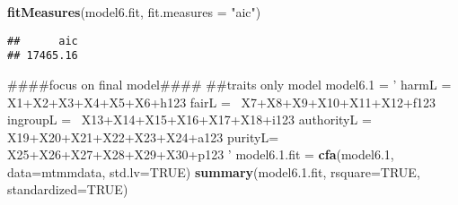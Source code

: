 \documentclass[english,man]{apa6}
\newenvironment{Shaded}{\begin{snugshade}}{\end{snugshade}}
\newcommand{\KeywordTok}[1]{\textcolor[rgb]{0.13,0.29,0.53}{\textbf{#1}}}
\newcommand{\DataTypeTok}[1]{\textcolor[rgb]{0.13,0.29,0.53}{#1}}
\newcommand{\DecValTok}[1]{\textcolor[rgb]{0.00,0.00,0.81}{#1}}
\newcommand{\FloatTok}[1]{\textcolor[rgb]{0.00,0.00,0.81}{#1}}
\newcommand{\StringTok}[1]{\textcolor[rgb]{0.31,0.60,0.02}{#1}}
\newcommand{\OtherTok}[1]{\textcolor[rgb]{0.56,0.35,0.01}{#1}}
\newcommand{\NormalTok}[1]{#1}
\newcounter{author}
\theoremstyle{definition}
\theoremstyle{definition}
\theoremstyle{definition}
\theoremstyle{remark}
\begin{document}
\begin{Shaded}
\begin{Highlighting}[]
\KeywordTok{fitMeasures}\NormalTok{(model6.fit, }\DataTypeTok{fit.measures =} \StringTok{"aic"}\NormalTok{)}
\end{Highlighting}
\end{Shaded}

\begin{verbatim}
##      aic 
## 17465.16
\end{verbatim}

\begin{Shaded}
\begin{Highlighting}[]
\NormalTok{####focus on final model####}
\NormalTok{##traits only model}
\NormalTok{model6.}\DecValTok{1}\NormalTok{ =}\StringTok{ '}
\StringTok{harmL =~ X1+X2+X3+X4+X5+X6+h123}
\StringTok{fairL =~ X7+X8+X9+X10+X11+X12+f123}
\StringTok{ingroupL =~ X13+X14+X15+X16+X17+X18+i123}
\StringTok{authorityL =~ X19+X20+X21+X22+X23+X24+a123}
\StringTok{purityL=~ X25+X26+X27+X28+X29+X30+p123}
\StringTok{'}
\NormalTok{model6.}\FloatTok{1.}\NormalTok{fit =}\StringTok{ }\KeywordTok{cfa}\NormalTok{(model6.}\DecValTok{1}\NormalTok{, }\DataTypeTok{data=}\NormalTok{mtmmdata, }\DataTypeTok{std.lv=}\OtherTok{TRUE}\NormalTok{)}
\KeywordTok{summary}\NormalTok{(model6.}\FloatTok{1.}\NormalTok{fit, }\DataTypeTok{rsquare=}\OtherTok{TRUE}\NormalTok{, }\DataTypeTok{standardized=}\OtherTok{TRUE}\NormalTok{)}
\end{Highlighting}
\end{Shaded}
\end{document}
